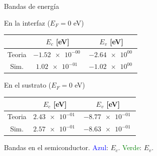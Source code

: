 \documentclass{/home/daniel/GitHub/USC-Physics-Degree-Notes/Notes/Presentacion}
\begin{document}
\begin{frame}{Bandas de energía}
    \begin{minipage}{0.4\linewidth}
        \begin{center}
            \small
            En la interfaz ($E_F=0$ eV)
            \vspace*{1em}

            \begin{tabular}{ccc}
                \toprule
                & $E_c $ [eV] & $E_v $ [eV]  \\ \midrule
                Teoria &  $\SI{-1.52e-00}{}$& $\SI{-2.64e+00}{}$\\
                Sim. &  $\SI{1.02e-01}{}$& $\SI{-1.02e+00}{}$  \\
                \bottomrule
            \end{tabular}

            \vspace*{2em}

            En el sustrato ($E_F=0$ eV) 

            \vspace*{1em}

            \begin{tabular}{ccc}
                \toprule
                & $E_c $ [eV] & $E_v $ [eV]  \\ \midrule
                Teoria & $\SI{2.43e-01}{}$ & $\SI{-8.77e-01}{}$ \\
                Sim. & $\SI{2.57e-01}{}$ & $\SI{-8.63e-01}{}$ \\
                \bottomrule
            \end{tabular}
        \end{center}
    \end{minipage}
    \hfill
    \begin{minipage}{0.55\linewidth}\centering

        Bandas en el semiconductor. \textcolor{blue}{Azul}: $E_c$. \textcolor{Green}{Verde}: $E_v$.  

        \vspace*{1em}
        

\end{minipage}
\end{frame}
\end{document}
